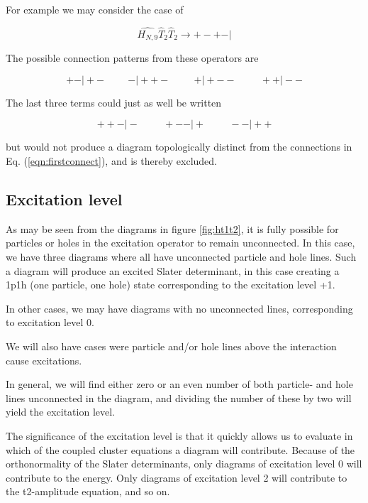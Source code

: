 For example we may consider the case of 

\begin{equation}
\hat{H_{N,9}} \hat{T}_2 \hat{T}_2 \rightarrow  + - + - \vert 
\end{equation}

The possible connection patterns from these operators are

\begin{equation}
  + -\vert  + - \hspace{1cm}  -\vert  + + -  \hspace{1cm}  + \vert  + - - \hspace{1cm}  ++ \vert  - -
\label{eqn:firstconnect}
\end{equation}

The last three terms could just as well be written

\begin{equation}
 + + -\vert  -  \hspace{1cm}  + - - \vert  + \hspace{1cm} - - \vert  + +
\end{equation}

but would not produce a diagram topologically distinct from the connections in Eq. (\ref{eqn:firstconnect}), and is thereby excluded.


\subsection{Excitation level}

As may be seen from the diagrams in figure \ref{fig:ht1t2}, it is fully possible for particles or holes in the excitation operator to remain unconnected. In this case, we have three diagrams where all have unconnected particle and hole lines. Such a diagram will produce an excited Slater determinant, in this case creating a 1p1h (one particle, one hole) state corresponding to the excitation level +1.

In other cases, we may have diagrams with no unconnected lines, corresponding to excitation level 0.

We will also have cases were particle and/or hole lines above the interaction cause excitations.

In general, we will find either zero or an even number of both particle- and hole lines unconnected in the diagram, and dividing the number of these by two will yield the excitation level.

The significance of the excitation level is that it quickly allows us to evaluate in which of the coupled cluster equations a diagram will contribute. Because of the orthonormality of the Slater determinants, only diagrams of excitation level 0 will contribute to the energy. Only diagrams of excitation level 2 will contribute to the t2-amplitude equation, and so on.

